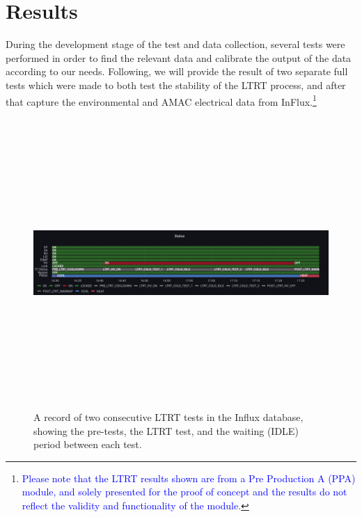 
\chapter{Results} %

\label{Results} %


\newcommand{\keyword}[1]{\textbf{#1}}
\newcommand{\tabhead}[1]{\textbf{#1}}
\newcommand{\code}[1]{\texttt{#1}}
\newcommand{\file}[1]{\texttt{\bfseries#1}}
\newcommand{\option}[1]{\texttt{\itshape#1}}


During the development stage of the test and data collection, several tests were performed in order to find the relevant data and calibrate the output of the data according to our needs. Following, we will provide the result of two separate full tests which were made to both test the stability of the LTRT process, and after that capture the environmental and AMAC electrical data from InFlux.\footnote{\textcolor{blue}{Please note that the LTRT results shown are from a Pre Production A (PPA) module, and solely presented for the proof of concept and the results do not reflect the validity and functionality of the module.}} \\


\begin{figure}[h]
    \centering
    \includegraphics[width=14cm,height=11cm,keepaspectratio]{Figures/results/test_period.png}
    \caption{A record of two consecutive LTRT tests in the Influx database, showing the pre-tests, the LTRT test, and the waiting (IDLE) period between each test.}
    \label{fig:LTRTinflux}
\end{figure}

